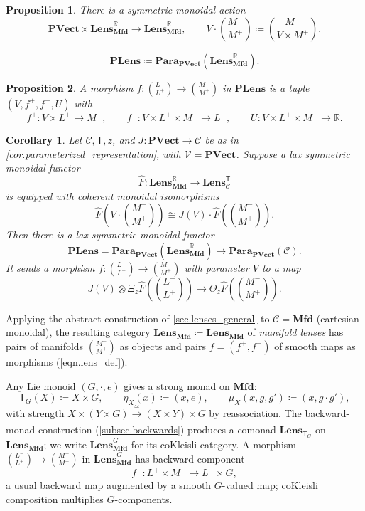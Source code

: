 \documentclass[11pt, oneside, article]{memoir}
\theoremstyle{definition}
\theoremstyle{plain}
\newtheorem{proposition}[proposition]{Proposition}
\newtheorem{corollary}[corollary]{Corollary}
\newenvironment{definition}
  {\pushQED{\qed}\renewcommand{\qedsymbol}{$\lozenge$}\definitionx}
  {\popQED\enddefinitionx}
\newcommand{\cat}[1]{\mathcal{#1}}%
\newcommand{\Cat}[1]{\mathbf{#1}}%
\newcommand{\Fun}[1]{\mathsf{#1}}%
\newcommand{\To}[2][]{\xrightarrow[#1]{#2}}
\newcommand{\rr}{\mathbb{R}}
\newcommand{\mfd}{\Cat{Mfd}}
\newcommand{\potlens}{\Cat{PLens}}
\newcommand{\Para}{\Cat{Para}}
\newcommand{\para}[2]{\Para_{#1}(#2)}
\newcommand{\pvect}{\Cat{PVect}}
\newcommand{\Lens}[1]{\Cat{Lens}_{#1}}
\newcommand{\lmfd}{\Lens{\mfd}}
\newcommand{\inpt}[1]{#1^{-}}
\newcommand{\outp}[1]{#1^{+}}
\newcommand{\lensob}[1]{\binom{\inpt{#1}}{\outp{#1}}}%
\begin{document}
\begin{proposition}\label{prop.pvect_action_lmfd_potential}
There is a symmetric monoidal action
\[
\pvect\times\lmfd^\rr\to\lmfd^\rr,\qquad V\cdot\lensob M\coloneqq\binom{\inpt M}{V\times\outp M}.
\]
\end{proposition}

\begin{definition}\label{def.potlens}
\[
\potlens\coloneqq\para{\pvect}{\lmfd^\rr}.
\]
\end{definition}

\begin{proposition}\label{prop.potlens_maps}
A morphism $f\colon\lensob L\to\lensob M$ in $\potlens$ is a tuple $(V,\outp f,\inpt f,U)$ with
\[
\outp f\colon V\times\outp L\to\outp M,\qquad
\inpt f\colon V\times\outp L\times\inpt M\to\inpt L,\qquad
U\colon V\times\outp L\times\inpt M\to\rr.
\]
\end{proposition}

\begin{corollary}\label{cor.potlens_parameterized_representation}
Let $\cat C,\Fun T,z$, and $J\colon\pvect\to\cat C$ be as in \cref{cor.parameterized_representation}, with $\cat V=\pvect$. Suppose a lax symmetric monoidal functor
\[
\widehat F\colon\lmfd^\rr\to\Lens{\cat C}^{\Fun T}
\]
is equipped with coherent monoidal isomorphisms
\[
\widehat F(V\cdot\lensob M)\cong J(V)\cdot\widehat F(\lensob M).
\]
Then there is a lax symmetric monoidal functor
\[
\potlens=\para{\pvect}{\lmfd^\rr}\to\para{\pvect}{\cat C}.
\]
It sends a morphism $f\colon\lensob L\to\lensob M$ with parameter $V$ to a map
\[
J(V)\otimes\Xi_z\widehat F(\lensob L)\to\Theta_z\widehat F(\lensob M).
\]
\end{corollary}

\iffalse
Applying the abstract construction of \cref{sec.lenses_general} to $\cat C=\mfd$ (cartesian monoidal), the resulting category $\lmfd\coloneqq\Lens\mfd$ of \emph{manifold lenses} has pairs of manifolds $\lensob M$ as objects and pairs $f=(\outp f,\inpt f)$ of smooth maps as morphisms (\eqref{eqn.lens_def}).

Any Lie monoid $(G,\cdot,e)$ gives a strong monad on $\mfd$:
\[
\Fun T_G(X)\coloneqq X\times G,\qquad\eta_X(x)\coloneqq(x,e),\qquad\mu_X(x,g,g')\coloneqq(x,g\cdot g'),
\]
with strength $X\times(Y\times G)\To{\cong}(X\times Y)\times G$ by reassociation. The backward-monad construction (\cref{subsec.backwards}) produces a comonad $\Lens{\Fun T_G}$ on $\lmfd$; we write $\lmfd^G$ for its coKleisli category. A morphism $\lensob L\to\lensob M$ in $\lmfd^G$ has backward component
\[
\inpt f\colon\outp L\times\inpt M\to\inpt L\times G,
\]
a usual backward map augmented by a smooth $G$-valued map; coKleisli composition multiplies $G$-components.
\end{document}
